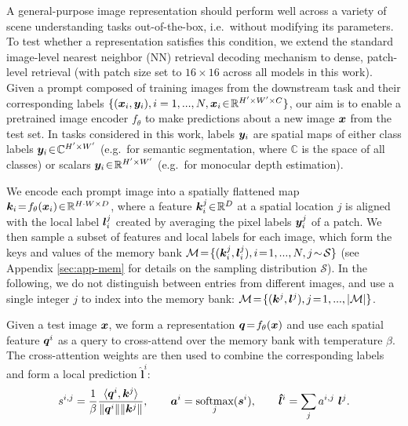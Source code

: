 \documentclass{article}
\newcommand{\eg}{e.g.\ }
\begin{document}
A general-purpose image representation should perform well across a variety of scene understanding tasks out-of-the-box, i.e.\ without modifying its parameters.
To test whether a representation satisfies this condition, we extend the standard image-level nearest neighbor (NN) retrieval \cite{belongie2002shape,boiman2008defense} decoding mechanism to dense, patch-level retrieval (with patch size set to $16 \times 16$ across all models in this work). Given a prompt composed of training images from the downstream task and their corresponding labels  $\{ ({\bm{x}}_i, {\bm{y}}_i), i=1,...,N, {\bm{x}}_i \!\in\! \mathbb{R}^{H' \times W' \times C}\}$, our aim is to enable a pretrained image encoder $f_\theta$ to make predictions about a new image ${\bm{x}}$ from the test set. In tasks considered in this work, labels ${\bm{y}}_i$ are spatial maps of either class labels ${\bm{y}}_i \!\in\! \mathbb{C}^{H' \times W'}$ (\eg for semantic segmentation, where $\mathbb{C}$ is the space of all classes) or scalars ${\bm{y}}_i \!\in\! \mathbb{R}^{H' \times W'}$ (\eg for monocular depth estimation).

We encode each prompt image into a spatially flattened map ${\bm{k}}_i \!=\! f_\theta({\bm{x}}_i) \!\in\! \mathbb{R}^{H \cdot W \times D}$, where a feature ${\bm{k}}_i^j \!\in\! \mathbb{R}^D$ at a spatial location $j$ is aligned with the local label ${\bm{l}}_i^j$ created by averaging the pixel labels ${\bm{y}}_i^j$ of a patch. We then sample a subset of features and local labels for each image, which form the keys and values of the memory bank $\mathcal{M} \!=\! \{ ({\bm{k}}_i^j, {\bm{l}}_i^j), i\!=\!1,...,N, j \!\sim\! \mathcal{S} \}$ (see Appendix \ref{sec:app-mem} for details on the sampling distribution $\mathcal{S}$). In the following, we do not distinguish between entries from different images, and use a single integer $j$ to index into the memory bank: $\mathcal{M} \!=\! \{ ({\bm{k}}^j, {\bm{l}}^j), j\!=\!1,...,|\mathcal{M}|\}$. 

Given a test image ${\bm{x}}$, we form a representation ${\bm{q}} \!=\! f_\theta({\bm{x}})$ and use each spatial feature ${\bm{q}}^i$ as a query to cross-attend over the memory bank with temperature $\beta$. The cross-attention weights are then used to combine the corresponding labels and form a local prediction $\bm{\hat{l}}^{i}$:
\begin{equation}
s^{i, j} = \frac{1}{\beta} \frac{\langle {\bm{q}}^i, {\bm{k}}^j \rangle}{ \lVert {\bm{q}}^i \rVert \lVert {\bm{k}}^j \rVert}, \qquad
{\bm{a}}^i = \underset{j}{\textrm{softmax}}({\bm{s}}^i), \qquad
\bm{\hat{l}}^{i} = \sum_{j} a^{i,j} \ {\bm{l}}^j.
\label{eq:nn-xattn}
\end{equation}
\end{document}
